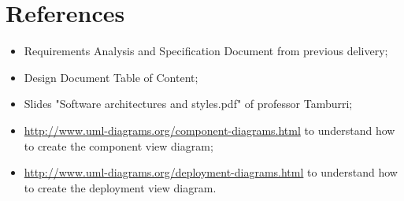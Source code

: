\documentclass[12pt,a4paper]{article}
\begin{document}
	
	\tableofcontents
	\newpage
	
	
	
	
	
	\newpage
	\section{References}
	\begin{itemize}
		\item Requirements Analysis and Specification Document from previous delivery;
		\item Design Document Table of Content;
		\item Slides "Software architectures and styles.pdf" of professor Tamburri;
		\item \url{http://www.uml-diagrams.org/component-diagrams.html} to understand how to create the component view diagram;
		\item \url{http://www.uml-diagrams.org/deployment-diagrams.html} to understand how to create the deployment view diagram.
	\end{itemize}
	
	
\end{document}
